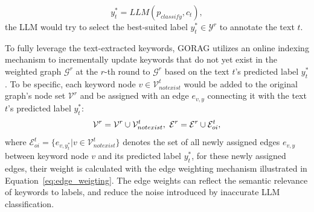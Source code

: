 \begin{equation}
	y^*_t=LLM(p_{classify}, c_t), 
\end{equation}
the LLM would try to select the best-suited label $y^*_t \in \mathcal{Y}^r$ to annotate the text $t$. 






To fully leverage the text-extracted keywords, GORAG utilizes an online indexing mechanism to incrementally update keywords that do not yet exist in the weighted graph $\mathcal{G}^r$ at the $r$-th round to $\mathcal{G}^r$ based on the text $t$'s predicted label $y^*_t$. 
To be specific, each keyword node $v\in \mathcal{V}_{notexist}^t$ would be added to the original graph's node set $\mathcal{V}^r$ and be assigned with an edge $e_{v,y}$ connecting it with the text $t$'s predicted label $y_t^*$:  
\vspace{-3px}
\begin{equation}
	\vspace{-3px}
	\mathcal{V}^r = \mathcal{V}^r \cup \mathcal{V}_{notexist}^t,\ \mathcal{E}^r = \mathcal{E}^r \cup \mathcal{E}_{oi}^t, 
\end{equation}
where $\mathcal{E}_{oi}^t=\{e_{v,y_t^*}| v\in \mathcal{V}_{notexist}^t\}$ denotes the set of all newly assigned edges $e_{v,y}$ between keyword node $v$ and its predicted label $y_t^*$, for these newly assigned edges, their weight is calculated with the edge weighting mechanism illustrated in Equation~\eqref{eq:edge_weigting}.
The edge weights can reflect the semantic relevance of keywords to labels, and reduce the noise introduced by inaccurate LLM classification.